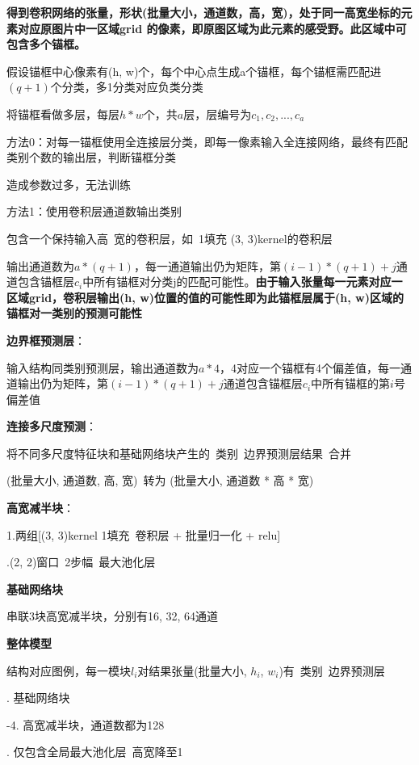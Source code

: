 \documentclass[UTF8]{ctexart}
\begin{document}
  \quad \textbf{得到卷积网络的张量，形状(批量大小，通道数，高，宽)，处于同一高宽坐标的元素对应原图片中一区域grid 的像素，即原图区域为此元素的感受野。此区域中可包含多个锚框。}
    
  \quad 假设锚框中心像素有(h, w)个，每个中心点生成a个锚框，每个锚框需匹配进$(q+1)$个分类，多1分类对应负类分类

  \quad \quad 将锚框看做多层，每层$h*w$个，共$a$层，层编号为$c_1, c_2, ..., c_a$

  \quad 方法0：对每一锚框使用全连接层分类，即每一像素输入全连接网络，最终有匹配类别个数的输出层，判断锚框分类

  \quad \quad 造成参数过多，无法训练

  \quad 方法1：使用卷积层通道数输出类别

  \quad \quad 包含一个保持输入高\ 宽的卷积层，如\ 1填充 (3, 3)kernel的卷积层

  \quad \quad 输出通道数为$a * (q+1)$，每一通道输出仍为矩阵，第$(i-1)*(q+1) + j$通道包含锚框层$c_i$中所有锚框对分类j的匹配可能性。\textbf{由于输入张量每一元素对应一区域grid，卷积层输出(h, w)位置的值的可能性即为此锚框层属于(h, w)区域的锚框对一类别的预测可能性}

  \textbf{边界框预测层}：

  \quad 输入结构同类别预测层，输出通道数为$a * 4$，4对应一个锚框有4个偏差值，每一通道输出仍为矩阵，第$(i-1)*(q+1) + j$通道包含锚框层$c_i$中所有锚框的第$i$号偏差值

  \textbf{连接多尺度预测}：

  \quad 将不同多尺度特征块和基础网络块产生的\ 类别\ 边界预测层结果\ 合并
  
  \quad (批量大小, 通道数, 高, 宽)\ 转为 (批量大小, 通道数 * 高 * 宽)
  
  \textbf{高宽减半块}：

  \quad 1.两组[(3, 3)kernel 1填充\ 卷积层 + 批量归一化 + relu]
  
  .(2, 2)窗口\ 2步幅\ 最大池化层

  \textbf{基础网络块}

  串联3块高宽减半块，分别有16, 32, 64通道

  \textbf{整体模型}
  
  \quad 结构对应图例，每一模块$l_i$对结果张量(批量大小, $h_i$, $w_i$)有\ 类别\ 边界预测层

  . 基础网络块

  -4. 高宽减半块，通道数都为128

  . 仅包含全局最大池化层\ 高宽降至1
\end{document}
